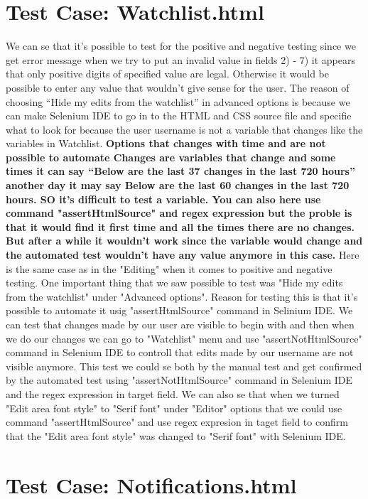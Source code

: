 \documentclass[a4paper,10pt]{article}
\begin{document}
\section*{Test Case: Watchlist.html}

We can se that it’s possible to test for the positive and negative testing since we get error message when we
try to put an invalid value in fields 2) - 7) it appears that only positive digits of specified value are legal. Otherwise
it would be possible to enter any value that wouldn’t give sense for the user. The reason of choosing “Hide my edits from the watchlist” in advanced options is because we can make Selenium IDE to go in to the HTML and CSS source file and specifie what to look for because the user 
username is not a variable that changes like the variables in Watchlist. \textbf{\color{red}Options that changes with time and are not possible to automate
Changes are variables that change and some times it can say “Below are the last 37 changes in the last 720 hours” another day it may say
Below are the last 60 changes in the last 720 hours. SO it’s difficult to test a variable. You can also here use command 
"assertHtmlSource" and regex expression but the proble is that it would find it first time and all the times there are no
changes. But after a while it wouldn't work since the variable would change and the automated test wouldn't have any
value anymore in this case.} 
Here is the same case as in the "Editing" when it comes to positive and negative testing. One important thing that
we saw possible to test was "Hide my edits from the watchlist" under "Advanced options". Reason for testing this is that it's
possible to automate it usig "assertHtmlSource" command in Selinium IDE. We can test that changes made by our user are visible 
to begin with and then when we do our changes we can go to "Watchlist" menu and use "assertNotHtmlSource" command in Selenium IDE
to controll that  edits made by our username are not visible anymore. This test we could se both by the manual test and get
confirmed by the automated test using "assertNotHtmlSource" command in Selenium IDE and the regex expression in target field.
We can also se that when we turned "Edit area font style" to "Serif font" under "Editor" options that we could use command
 "assertHtmlSource" and use regex expresion in taget field to confirm that the "Edit area font style" was changed to "Serif font" 
with Selenium IDE.


\section*{Test Case: Notifications.html}
\end{document}
